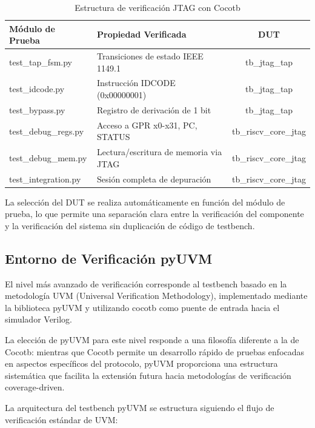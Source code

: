 \begin{table}[H]
\centering
\begin{tabular}{|l|p{6cm}|c|}
\hline
\textbf{Módulo de Prueba} & \textbf{Propiedad Verificada} & \textbf{DUT} \\
\hline
test\_tap\_fsm.py & Transiciones de estado IEEE 1149.1 & tb\_jtag\_tap \\
\hline
test\_idcode.py & Instrucción IDCODE (0x00000001) & tb\_jtag\_tap \\
\hline
test\_bypass.py & Registro de derivación de 1 bit & tb\_jtag\_tap \\
\hline
test\_debug\_regs.py & Acceso a GPR x0-x31, PC, STATUS & tb\_riscv\_core\_jtag \\
\hline
test\_debug\_mem.py & Lectura/escritura de memoria via JTAG & tb\_riscv\_core\_jtag \\
\hline
test\_integration.py & Sesión completa de depuración & tb\_riscv\_core\_jtag \\
\hline
\end{tabular}
\caption{Estructura de verificación JTAG con Cocotb}
\label{tab:CocotbTests}
\end{table}

La selección del DUT se realiza automáticamente en función del módulo de prueba, lo que permite una separación clara entre la verificación del componente y la verificación del sistema sin duplicación de código de testbench.

\subsection{Entorno de Verificación pyUVM}
\label{sec:pyUVM}

El nivel más avanzado de verificación corresponde al testbench basado en la metodología UVM (Universal Verification Methodology), implementado mediante la biblioteca pyUVM y utilizando cocotb como puente de entrada hacia el simulador Verilog.

La elección de pyUVM para este nivel responde a una filosofía diferente a la de Cocotb: mientras que Cocotb permite un desarrollo rápido de pruebas enfocadas en aspectos específicos del protocolo, pyUVM proporciona una estructura sistemática que facilita la extensión futura hacia metodologías de verificación coverage-driven.

La arquitectura del testbench pyUVM se estructura siguiendo el flujo de verificación estándar de UVM:

